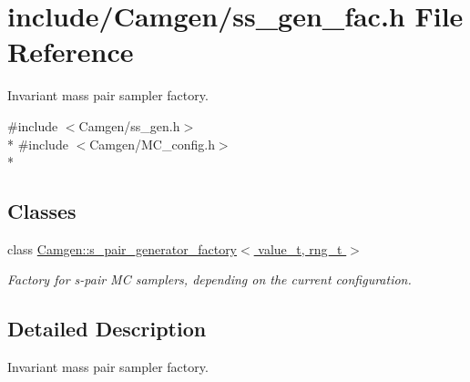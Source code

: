 \hypertarget{a00786}{}\section{include/\+Camgen/ss\+\_\+gen\+\_\+fac.h File Reference}
\label{a00786}


Invariant mass pair sampler factory.  


{\ttfamily \#include $<$Camgen/ss\+\_\+gen.\+h$>$}\\*
{\ttfamily \#include $<$Camgen/\+M\+C\+\_\+config.\+h$>$}\\*
\subsection*{Classes}
\begin{DoxyCompactItemize}
\item 
class \hyperlink{a00496}{Camgen\+::s\+\_\+pair\+\_\+generator\+\_\+factory$<$ value\+\_\+t, rng\+\_\+t $>$}
\begin{DoxyCompactList}\small\item\em Factory for s-\/pair M\+C samplers, depending on the current configuration. \end{DoxyCompactList}\end{DoxyCompactItemize}


\subsection{Detailed Description}
Invariant mass pair sampler factory. 

